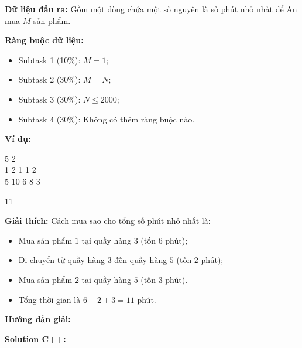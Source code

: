\documentclass[12pt]{scrartcl}  %
\begin{document}
\textbf{Dữ liệu đầu ra:}
Gồm một dòng chứa một số nguyên là số phút nhỏ nhất để An mua $M$ sản phẩm.

\textbf{Ràng buộc dữ liệu:}
\begin{itemize}
    \item Subtask 1 (10\%): $M = 1$;
    \item Subtask 2 (30\%): $M = N$;
    \item Subtask 3 (30\%): $N \leq 2000;$
    \item Subtask 4 (30\%): Không có thêm ràng buộc nào.
\end{itemize}

\textbf{Ví dụ:}
\begin{tcolorbox}[colback=gray!5!white, colframe=blue!50!black, title=Input]
5 2\\
1 2 1 1 2\\
5 10 6 8 3
\end{tcolorbox}

\begin{tcolorbox}[colback=gray!5!white, colframe=green!50!black, title=Output]
11
\end{tcolorbox}

\textbf{Giải thích:}
Cách mua sao cho tổng số phút nhỏ nhất là:
\begin{itemize}
    \item Mua sản phẩm $1$ tại quầy hàng $3$ (tốn $6$ phút);
    \item Di chuyển từ quầy hàng $3$ đến quầy hàng $5$ (tốn $2$ phút);
    \item Mua sản phẩm $2$ tại quầy hàng $5$ (tốn $3$ phút).
    \item Tổng thời gian là $6 + 2 + 3 = 11$ phút.
\end{itemize}

\textbf{Hướng dẫn giải:}

\textbf{Solution C++:}
\end{document}
